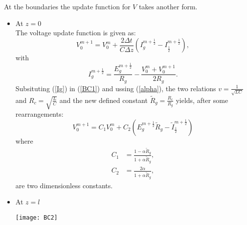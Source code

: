 At the boundaries the update function for $V$ takes another form.
\begin{itemize}
    \item At $z = 0$\\
    The voltage update function is given as:
    \begin{equation}
        V^{m+1}_{0} = V^{m}_{0} + \frac{2\Delta t}{C\Delta z}\left(I^{m+\frac{1}{2}}_{g} - I^{m+\frac{1}{2}}_{\frac{1}{2}}\right),
        \label{BC1}
    \end{equation}
    with 
    \begin{equation}
        I^{m+\frac{1}{2}}_{g} = \frac{E^{m+\frac{1}{2}}_{g}}{R_{g}}-\frac{V^{m}_{0}+V^{m+1}_{0}}{2R_g}.
        \label{Ig}
    \end{equation}
    Subsituting (\ref{Ig}) in (\ref{BC1}) and ussing (\ref{alpha}), the two relations $v=\frac{1}{\sqrt{LC}}$ and $R_c=\sqrt{\frac{L}{C}}$ and the new defined constant $\tilde{R}_{g} = \frac{R_c}{R_g}$ yields, 
    after some rearrangements:
    \begin{equation}
        V^{m+1}_{0} = C_{1}V^{m}_{0} + C_{2}\left(E^{m+\frac{1}{2}}_{g}\tilde{R}_{g} - \tilde{I}^{m+\frac{1}{2}}_{\frac{1}{2}}\right)
    \end{equation}
    where
    \begin{align}
        C_{1} & = \frac{1-\alpha\tilde{R}_{g}}{1+\alpha\tilde{R}_{g}},\\
        C_{2} & = \frac{2\alpha}{1+\alpha\tilde{R}_{g}},
    \end{align}
    are two dimensionless constants.
    \item At $z = l$\\
    
    \begin{center}
    \texttt{[image: BC2]}
    \end{center}


\end{itemize}
